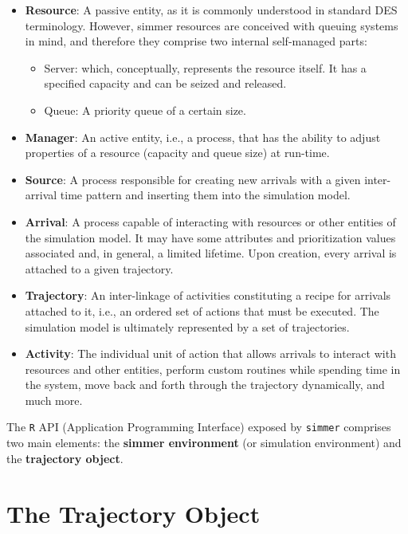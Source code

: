\documentclass[
]{book}
\providecommand{\tightlist}{%
  \setlength{\itemsep}{0pt}\setlength{\parskip}{0pt}}
\theoremstyle{definition}
\theoremstyle{definition}
\theoremstyle{definition}
\theoremstyle{definition}
\theoremstyle{remark}
\begin{document}
\begin{itemize}
\item
  \textbf{Resource}: A passive entity, as it is commonly understood in standard DES terminology. However, simmer resources are conceived with queuing systems in mind, and therefore they comprise two internal self-managed parts:

  \begin{itemize}
  \tightlist
  \item
    Server: which, conceptually, represents the resource itself. It has a specified capacity and can be seized and released.
  \item
    Queue: A priority queue of a certain size.
  \end{itemize}
\item
  \textbf{Manager}: An active entity, i.e., a process, that has the ability to adjust properties of a resource (capacity and queue size) at run-time.
\item
  \textbf{Source}: A process responsible for creating new arrivals with a given inter-arrival time pattern and inserting them into the simulation model.
\item
  \textbf{Arrival}: A process capable of interacting with resources or other entities of the simulation model. It may have some attributes and prioritization values associated and, in general, a limited lifetime. Upon creation, every arrival is attached to a given trajectory.
\item
  \textbf{Trajectory}: An inter-linkage of activities constituting a recipe for arrivals attached to it, i.e., an ordered set of actions that must be executed. The simulation model is ultimately represented by a set of trajectories.
\item
  \textbf{Activity}: The individual unit of action that allows arrivals to interact with resources and other entities, perform custom routines while spending time in the system, move back and forth through the trajectory dynamically, and much more.
\end{itemize}

The \texttt{R} API (Application Programming Interface) exposed by \texttt{simmer} comprises two main elements: the \textbf{simmer environment} (or simulation environment) and the \textbf{trajectory object}.

\hypertarget{the-trajectory-object}{%
\section{The Trajectory Object}\label{the-trajectory-object}}
\end{document}
